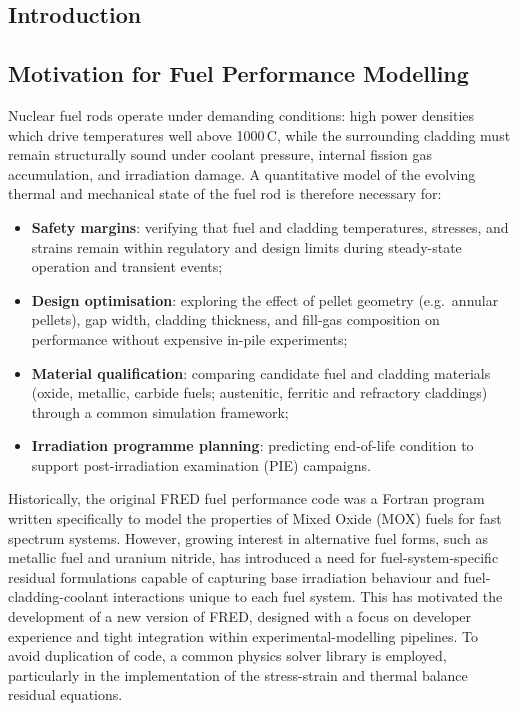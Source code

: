 \begin{refsection}

\section{Introduction}
\label{sec:introduction}

\subsection{Motivation for Fuel Performance Modelling}

Nuclear fuel rods operate under demanding conditions: high power densities which drive temperatures well above 1000\,\textdegree C, while the surrounding cladding must remain structurally sound under coolant pressure, internal fission gas accumulation, and irradiation damage.  A quantitative model of the evolving thermal and mechanical state of the fuel rod is therefore necessary for:

\begin{itemize}
\item \textbf{Safety margins}: verifying that fuel and cladding temperatures, stresses, and strains remain within regulatory and design limits during steady-state operation and transient events;
\item \textbf{Design optimisation}: exploring the effect of pellet geometry (e.g.\ annular pellets), gap width, cladding thickness, and fill-gas composition on performance without expensive in-pile experiments;
\item \textbf{Material qualification}: comparing candidate fuel and cladding materials (oxide, metallic, carbide fuels; austenitic, ferritic and refractory claddings) through a common simulation framework;
\item \textbf{Irradiation programme planning}: predicting end-of-life condition to support post-irradiation examination (PIE) campaigns.
\end{itemize}

Historically, the original FRED fuel performance code was a Fortran program written specifically to model the properties of Mixed Oxide (MOX) fuels for fast spectrum systems. However, growing interest in alternative fuel forms, such as metallic fuel and uranium nitride, has introduced a need for fuel-system-specific residual formulations capable of capturing base irradiation behaviour and fuel-cladding-coolant interactions unique to each fuel system. This has motivated the development of a new version of FRED, designed with a focus on developer experience and tight integration within experimental-modelling pipelines. To avoid duplication of code, a common physics solver library is employed, particularly in the implementation of the stress-strain and thermal balance residual equations.


\end{refsection}
